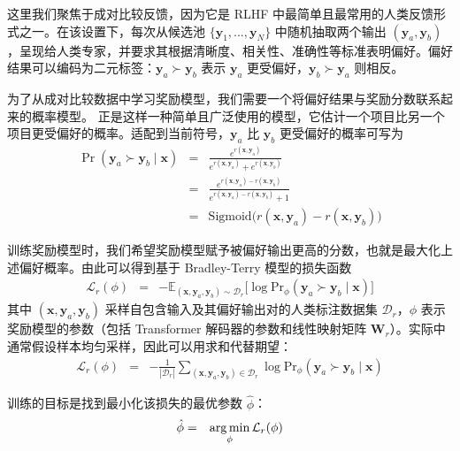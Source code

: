 这里我们聚焦于成对比较反馈，因为它是 RLHF 中最简单且最常用的人类反馈形式之一。在该设置下，每次从候选池 $\{\mathbf{y}_1,\dots,\mathbf{y}_N\}$ 中随机抽取两个输出 $(\mathbf{y}_a,\mathbf{y}_b)$，呈现给人类专家，并要求其根据清晰度、相关性、准确性等标准表明偏好。偏好结果可以编码为二元标签：$\mathbf{y}_a \succ \mathbf{y}_b$ 表示 $\mathbf{y}_a$ 更受偏好，$\mathbf{y}_b \succ \mathbf{y}_a$ 则相反。

为了从成对比较数据中学习奖励模型，我们需要一个将偏好结果与奖励分数联系起来的概率模型。 \cite{bradley-and-terry:rank} 正是这样一种简单且广泛使用的模型，它估计一个项目比另一个项目更受偏好的概率。适配到当前符号，$\mathbf{y}_a$ 比 $\mathbf{y}_b$ 更受偏好的概率可写为
\begin{eqnarray}
\Pr(\mathbf{y}_a \succ \mathbf{y}_b \mid \mathbf{x}) & = & \frac{e^{r(\mathbf{x},\mathbf{y}_a)}}{e^{r(\mathbf{x},\mathbf{y}_a)} + e^{r(\mathbf{x},\mathbf{y}_b)}} \nonumber \\
                                                  & = & \frac{e^{r(\mathbf{x},\mathbf{y}_a)-r(\mathbf{x},\mathbf{y}_b)}}{e^{r(\mathbf{x},\mathbf{y}_a)-r(\mathbf{x},\mathbf{y}_b)}+1} \nonumber \\
                                                  & = & \mathrm{Sigmoid}\bigl(r(\mathbf{x},\mathbf{y}_a)-r(\mathbf{x},\mathbf{y}_b)\bigr)
\end{eqnarray}

训练奖励模型时，我们希望奖励模型赋予被偏好输出更高的分数，也就是最大化上述偏好概率。由此可以得到基于 Bradley-Terry 模型的损失函数
\begin{eqnarray}
\mathcal{L}_r(\phi) & = & -\mathbb{E}_{(\mathbf{x},\mathbf{y}_a,\mathbf{y}_b) \sim \mathcal{D}_r} \bigl[ \log \mathrm{Pr}_{\phi}(\mathbf{y}_a \succ \mathbf{y}_b \mid \mathbf{x}) \bigr] \label{eq:pairwise-reward-loss-expectation}
\end{eqnarray}
其中 $(\mathbf{x},\mathbf{y}_a,\mathbf{y}_b)$ 采样自包含输入及其偏好输出对的人类标注数据集 $\mathcal{D}_r$，$\phi$ 表示奖励模型的参数（包括 Transformer 解码器的参数和线性映射矩阵 $\mathbf{W}_{r}$）。实际中通常假设样本均匀采样，因此可以用求和代替期望：
\begin{eqnarray}
\mathcal{L}_r(\phi) & = & -\frac{1}{|\mathcal{D}_r|} \sum_{(\mathbf{x},\mathbf{y}_a,\mathbf{y}_b) \in \mathcal{D}_r} \log \mathrm{Pr}_{\phi}(\mathbf{y}_a \succ \mathbf{y}_b \mid \mathbf{x}) \label{eq:pairwise-reward-loss-sum}
\end{eqnarray}

训练的目标是找到最小化该损失的最优参数 $\hat{\phi}$：
\begin{eqnarray}
\hat{\phi} & = & \operatorname*{arg\,min}_{\phi} \mathcal{L}_r(\phi)
\end{eqnarray}

